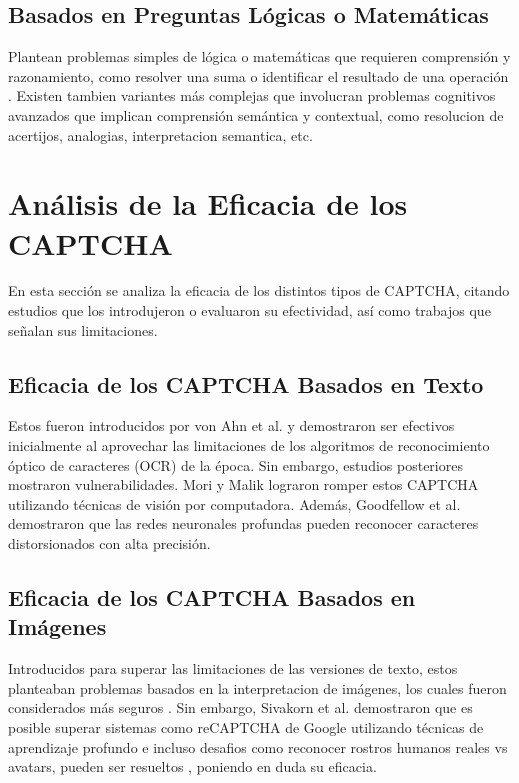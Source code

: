\documentclass[conference]{IEEEtran}
\begin{document}
\subsection{Basados en Preguntas Lógicas o Matemáticas}

Plantean problemas simples de lógica o matemáticas que requieren comprensión y razonamiento, como resolver una suma o identificar el resultado de una operación \cite{HernandezCastro2010}. Existen tambien variantes más complejas que involucran problemas cognitivos avanzados que implican comprensión semántica y contextual, como resolucion de acertijos, analogias, interpretacion semantica, etc. \cite{Algwil2023}

\section{Análisis de la Eficacia de los CAPTCHA}

En esta sección se analiza la eficacia de los distintos tipos de CAPTCHA, citando estudios que los introdujeron o evaluaron su efectividad, así como trabajos que señalan sus limitaciones.

\subsection{Eficacia de los CAPTCHA Basados en Texto}

Estos fueron introducidos por von Ahn et al. \cite{VonAhn2003} y demostraron ser efectivos inicialmente al aprovechar las limitaciones de los algoritmos de reconocimiento óptico de caracteres (OCR) de la época. Sin embargo, estudios posteriores mostraron vulnerabilidades. Mori y Malik \cite{Mori2003} lograron romper estos CAPTCHA utilizando técnicas de visión por computadora. Además, Goodfellow et al. \cite{Goodfellow2014} demostraron que las redes neuronales profundas pueden reconocer caracteres distorsionados con alta precisión.

\subsection{Eficacia de los CAPTCHA Basados en Imágenes}

Introducidos para superar las limitaciones de las versiones de texto, estos planteaban problemas basados en la interpretacion de imágenes, los cuales fueron considerados más seguros \cite{Gossweiler2009}. Sin embargo, Sivakorn et al. \cite{Sivakorn2016} demostraron que es posible superar sistemas como reCAPTCHA de Google utilizando técnicas de aprendizaje profundo e incluso desafios como reconocer rostros humanos reales vs avatars, pueden ser resueltos \cite{Zhu2010}, poniendo en duda su eficacia.
\end{document}
